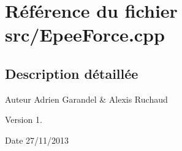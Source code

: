\section{Référence du fichier src/\-Epee\-Force.cpp}
\label{_epee_force_8cpp}


\subsection{Description détaillée}
\begin{DoxyAuthor}{Auteur}
Adrien Garandel \& Alexis Ruchaud 
\end{DoxyAuthor}
\begin{DoxyVersion}{Version}
1. 
\end{DoxyVersion}
\begin{DoxyDate}{Date}
27/11/2013 
\end{DoxyDate}
